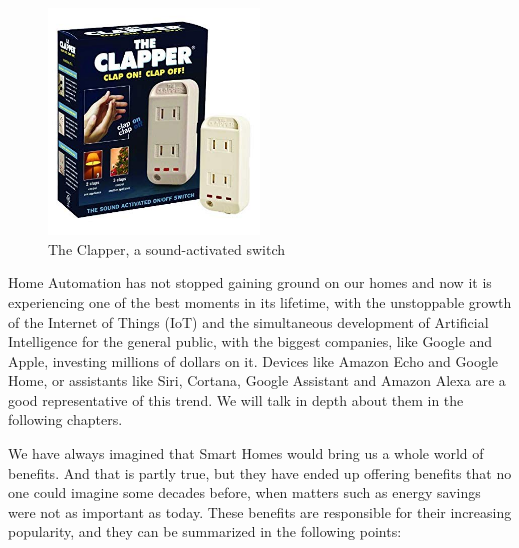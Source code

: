 \begin{figure}
	\centering
	\includegraphics[width=0.5\textwidth]{images/Chapter_03/the-clapper.jpg}
	\caption{The Clapper, a sound-activated switch}
	\label{fig:the-clapper}
\end{figure}

Home Automation has not stopped gaining ground on our homes and now it is experiencing one of the best moments
in its lifetime, with the unstoppable growth of the Internet of Things (IoT) and the simultaneous development of Artificial
Intelligence for the general public, with the biggest companies, like Google and Apple, investing millions of dollars on it.
Devices like Amazon Echo and Google Home, or assistants like Siri, Cortana, Google Assistant and Amazon Alexa are a
good representative of this trend. We will talk in depth about them in the following chapters.

We have always imagined that Smart Homes would bring us a whole world of benefits. And that is partly true, but
they have ended up offering benefits that no one could imagine some decades before, when matters such as energy
savings were not as important as today. These benefits are responsible for their increasing popularity, and they can be
summarized in the following points:

